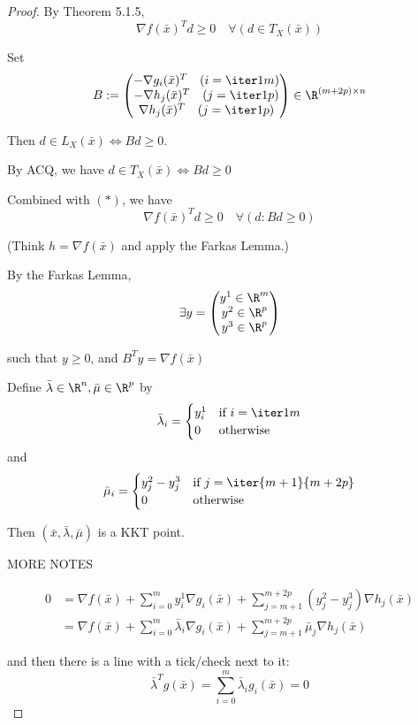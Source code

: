 \begin{proof}
	\def\bm{\bar\mu}\def\bl{\bar\lambda}\def\bx{\bar x}
	By Theorem 5.1.5,
	\begin{equation}
		\nabla f(\bx)^Td\geq0\quad\forall(d\in T_X(\bx))\tag*{($*$)}
	\end{equation}

	Set
	$$
		B:=\begin{pmatrix}
			-\nabla g_i(\bx)^T\quad(i=\iter1m) \\
			-\nabla h_j(\bx)^T\quad(j=\iter1p) \\
			\nabla h_j(\bx)^T\quad(j=\iter1p)
		\end{pmatrix}\in\R^{(m+2p)\times{n}}
	$$

	Then $d\in L_X(\bx)\iff Bd\geq0$.

	By ACQ, we have $d\in T_X(\bx)\iff Bd\geq0$

	Combined with $(*)$, we have
	$$
		\nabla f(\bx)^Td\geq0\quad\forall(d:Bd\geq0)
	$$

	(Think $h=\nabla f(\bx)$ and apply the Farkas Lemma.)

	By the Farkas Lemma,
	$$
		\exists y=\begin{pmatrix}y^1\in\R^m\\y^2\in\R^p\\y^3\in\R^p\end{pmatrix}
	$$

	such that $y\geq0$, and $B^Ty=\nabla f(\bx)$

	Define $\bl\in\R^n,\bm\in\R^p$ by
	$$
		\bl_i=\begin{cases}
			y^1_i & \text{if $i=\iter1m$} \\
			0     & \text{otherwise}
		\end{cases}
	$$
	and
	$$
		\bm_i=\begin{cases}
			y^2_j - y^3_j & \text{if $j=\iter{m+1}{m+2p}$} \\
			0             & \text{otherwise}
		\end{cases}
	$$

	Then $(\bx,\bl,\bm)$ is a KKT point.

	MORE NOTES

	\begin{align}
		0
		 & = \nabla f(\bx)
		+\sum_{i=0}^my^1_i\nabla g_i(\bx)
		+\sum_{j=m+1}^{m+2p}(y^2_j-y^3_j)\nabla h_j(\bx) \\
		 & = \nabla f(\bx)
		+\sum_{i=0}^m \bl_i\nabla g_i(\bx)
		+\sum_{j=m+1}^{m+2p}\bm_j\nabla h_j(\bx)
	\end{align}

	and then there is a line with a tick/check next to it:
	$$
		\bl^Tg(\bx)=\sum_{i=0}^m\bl_ig_i(\bx)=0
	$$
\end{proof}

